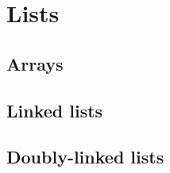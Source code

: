\chapter{Lists}
\label{chap:lists}

\section{Arrays}


\section{Linked lists}

\section{Doubly-linked lists}
